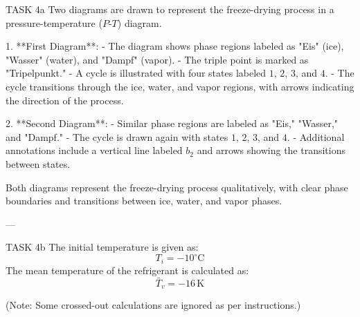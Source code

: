 TASK 4a  
Two diagrams are drawn to represent the freeze-drying process in a pressure-temperature (\(P\)-\(T\)) diagram.  

1. **First Diagram**:  
   - The diagram shows phase regions labeled as "Eis" (ice), "Wasser" (water), and "Dampf" (vapor).  
   - The triple point is marked as "Tripelpunkt."  
   - A cycle is illustrated with four states labeled \(1\), \(2\), \(3\), and \(4\).  
   - The cycle transitions through the ice, water, and vapor regions, with arrows indicating the direction of the process.  

2. **Second Diagram**:  
   - Similar phase regions are labeled as "Eis," "Wasser," and "Dampf."  
   - The cycle is drawn again with states \(1\), \(2\), \(3\), and \(4\).  
   - Additional annotations include a vertical line labeled \(b_2\) and arrows showing the transitions between states.  

Both diagrams represent the freeze-drying process qualitatively, with clear phase boundaries and transitions between ice, water, and vapor phases.

---

TASK 4b  
The initial temperature is given as:  
\[
T_i = -10^\circ\text{C}
\]  
The mean temperature of the refrigerant is calculated as:  
\[
\bar{T}_v = -16 \, \text{K}
\]  

(Note: Some crossed-out calculations are ignored as per instructions.)